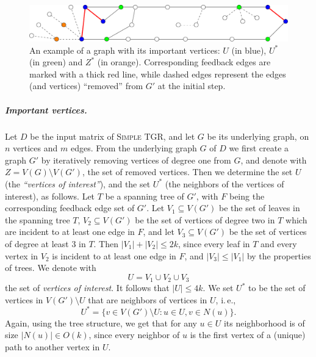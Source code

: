 \documentclass[a4paper,UKenglish,cleveref, autoref, thm-restate, anonymous]{lipics-v2021}
\newcommand{\ie}{i.\,e.,\ }
\newcommand{\deltaExact}{\textsc{Simple TGR}}
\begin{document}
\begin{figure}[t]
	\centering
	\includegraphics[width=0.8\columnwidth]{fig-example-names-vertices_new}
	\caption{An example of a graph with its important vertices: $U$ (in blue), $U^*$ (in green) and $Z^*$ (in orange).
    Corresponding feedback edges are marked with a thick red line, while dashed edges represent the edges (and vertices) ``removed'' from $G'$ at the initial step.
	\label{fig:labelingVertices}}
\end{figure}

\subparagraph{Important vertices.}
Let $D$ be the input matrix of \deltaExact, and let $G$ be its underlying graph, on $n$ vertices and $m$ edges.
From the underlying graph $G$ of $D$ we first create a graph $G'$ by
iteratively removing vertices of degree one from $G$,
and denote with 
$
Z = V(G) \setminus V(G')
$, the set of removed vertices.
Then we determine the set $U$ (the \emph{``vertices of interest''}), and the set $U^*$ (the neighbors of the vertices of interest), as follows.
Let $T$ be a spanning tree of $G'$, with $F$ being the corresponding feedback edge set of $G'$.
Let $V_1 \subseteq V(G')$ be the set of leaves in the spanning tree $T$, $V_2 \subseteq V(G')$ be the set of vertices of degree two in $T$ which are incident to at least one edge in $F$, 
and let $V_3 \subseteq V(G')$ be the set of vertices of degree at least $3$ in $T$. 
Then $|V_1| + |V_2| \leq 2k$, since every leaf in $T$ and every vertex in $V_2$ is incident to at least one edge in $F$,
and $|V_3| \leq |V_1|$ by the properties of trees.
We denote with 
\[U = V_1 \cup V_2 \cup V_3\]
the set of \emph{vertices of interest}. It follows that $|U| \leq 4k$.
We set $U^*$ to be the set of vertices in $V(G') \setminus U$ that are neighbors of vertices in $U$, \ie 
\[U^* = \{v \in V(G') \setminus U  :  u \in U, v \in N(u)\}.\]
Again, using the tree structure, we get that for any $u \in U$ its neighborhood is of size $|N(u)| \in O(k)$, since every neighbor of $u$ is the first vertex of a (unique) path to another vertex in $U$.
\end{document}

